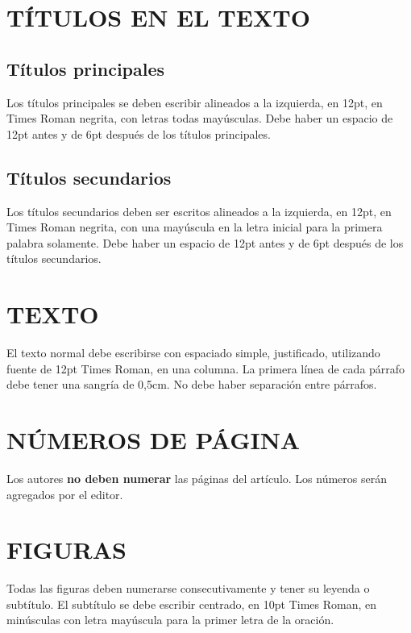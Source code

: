 \documentclass[oneside,a4paper,spanish,links]{amca}
\begin{document}
\section{TÍTULOS EN EL TEXTO}

\subsection{Títulos principales}

Los títulos principales se deben escribir alineados a la
izquierda, en 12pt, en Times Roman negrita, con letras todas
mayúsculas. Debe haber un espacio de 12pt antes y de 6pt después
de los títulos principales.

\subsection{Títulos secundarios}

Los títulos secundarios deben ser escritos alineados a la
izquierda, en 12pt, en Times Roman negrita, con una mayúscula en
la letra inicial para la primera palabra solamente. Debe haber un
espacio de 12pt antes y de 6pt después de los títulos secundarios.

\section{TEXTO}

El texto normal debe escribirse con espaciado simple, justificado,
utilizando fuente de 12pt Times Roman, en una columna. La primera
línea de cada párrafo debe tener una sangría de 0,5cm. No debe
haber separación entre párrafos.

\section{NÚMEROS DE PÁGINA}

Los autores {\bf no deben numerar} las páginas del artículo. Los
números serán agregados por el editor.

\section{FIGURAS}

Todas las figuras deben numerarse consecutivamente y tener su
leyenda o subtítulo. El subtítulo se debe escribir centrado, en
10pt Times Roman, en minúsculas con letra mayúscula para la primer
letra de la oración.
\end{document}
